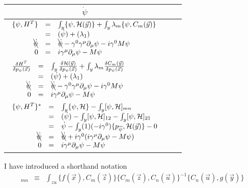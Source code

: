 \documentclass[aps,preprint,preprintnumbers,nofootinbib,showpacs,prd]{revtex4-1}
\newcommand{\ba}{\begin{array}}
\newcommand{\ea}{\end{array}}
\newcommand{\nbea}{\begin{eqnarray*}}
\newcommand{\neea}{\end{eqnarray*}}
\begin{document}
\begin{center}
    \begin{tabular}{ | l |}
    \hline
    \multicolumn{1}{|c|}{$\dot \psi$} \\
    \hline
    $\ba {rcl}
\{\psi, H^T\} & = & \int_y\{\psi, \mathcal{H}(\vec y)\} + \int_y \lambda_m \{\psi, C_m(\vec y)\} \\
& = & (\dot \psi) + (\lambda_1) \\
\bcancel{\dot \psi} & = & \bcancel{\dot \psi} -\gamma^0\gamma^\mu\partial_\mu \psi - i \gamma^0 M\psi \\
0 & = & i \gamma^\mu\partial_\mu \psi - M\psi
\ea$
      \\ \cline{1-1}
    $\ba {rcl}
\frac{\delta H^T}{\delta p_\psi(\vec x)} & = & \int_y\frac{\delta \mathcal{H}(\vec y)}{\delta p_\psi(\vec x)} +  \int_y \lambda_m \frac{\delta C_m(\vec y)}{\delta p_\psi(\vec x)} \\
& = &  (\dot \psi) + (\lambda_1) \\
\bcancel{\dot \psi} & = & \bcancel{\dot \psi} -\gamma^0\gamma^\mu\partial_\mu \psi - i \gamma^0 M\psi \\
0 & = & i \gamma^\mu\partial_\mu \psi - M\psi
\ea$
      \\ \cline{1-1}
   $\ba {rcl}
\{\psi, H^T\}^* & = & \int_y\{\psi, \mathcal{H}\} - \int_y[\psi, \mathcal{H}]_{mn} \\
& = & (\dot \psi) - \int_y [\psi, \mathcal{H}]_{12} - \int_y [\psi, \mathcal{H}]_{21} \\
& = & \dot \psi -\int_y(1)(-i \gamma^0)\{p_{\overline \psi}, \mathcal{H}(\vec y)\} - 0 \\
\bcancel{\dot \psi} & = & \bcancel{\dot \psi} + i \gamma^0 (i \gamma^\mu\partial_\mu \psi - M\psi) \\
0 & = & i \gamma^\mu\partial_\mu \psi - M\psi
\ea$
     \\
    \hline
    \end{tabular}
\end{center}
I have introduced a shorthand notation 
%
\nbea
[f(\vec x),g(\vec y)]_{mn} & \equiv & \int_{zu} \{f(\vec x), C_m(\vec z)\}\{C_m(\vec z), C_n(\vec u)\}^{-1}\{C_n(\vec u), g(\vec y)\}
\neea
%
\end{document}

